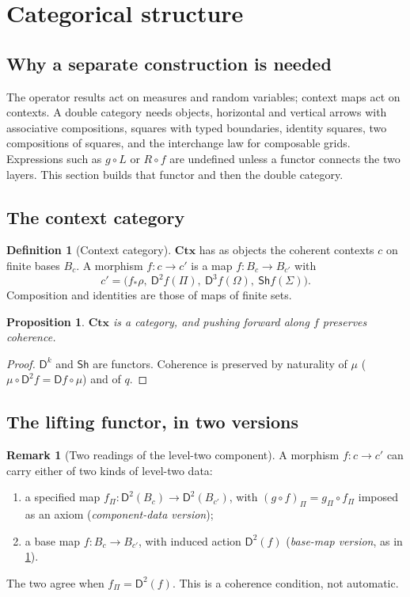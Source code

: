 \documentclass[11pt]{article}
\newtheorem{proposition}[theorem]{Proposition}
\theoremstyle{definition}
\newtheorem{definition}[theorem]{Definition}
\newtheorem{remark}[theorem]{Remark}
\newcommand{\D}{\mathsf D}
\newcommand{\Sh}{\mathsf{Sh}}
\newcommand{\Ctx}{\mathbf{Ctx}}
\begin{document}
\section{Categorical structure}\label{sec:category}

\subsection{Why a separate construction is needed}
The operator results act on measures and random variables; context maps act on contexts. A double category needs objects, horizontal
and vertical arrows with associative compositions, squares with typed boundaries, identity squares, two compositions of squares,
and the interchange law for composable grids. Expressions such as $g\circ L$ or $R\circ f$ are undefined unless a functor connects the
two layers. This section builds that functor and then the double category.

\subsection{The context category}
\begin{definition}[Context category]\label{def:ctx}
$\Ctx$ has as objects the coherent contexts $c$ on finite bases $B_c$. A morphism $f\colon c\to c'$ is a map $f\colon B_c\to B_{c'}$
with
\[
c'=\big(f_*\rho,\ \D^2f(\Pi),\ \D^3f(\Omega),\ \Sh f(\Sigma)\big).
\]
Composition and identities are those of maps of finite sets.
\end{definition}

\begin{proposition}
$\Ctx$ is a category, and pushing forward along $f$ preserves coherence.
\end{proposition}
\begin{proof}
$\D^k$ and $\Sh$ are functors. Coherence is preserved by naturality of $\mu$ ($\mu\circ\D^2f=\D f\circ\mu$) and of $q$.
\end{proof}

\subsection{The lifting functor, in two versions}
\begin{remark}[Two readings of the level-two component]\label{rem:two-versions}
A morphism $f\colon c\to c'$ can carry either of two kinds of level-two data:
\begin{enumerate}[label=(\roman*)]
\item a specified map $f_\Pi\colon\D^2(B_c)\to\D^2(B_{c'})$, with $(g\circ f)_\Pi=g_\Pi\circ f_\Pi$ imposed as an axiom
  (\emph{component-data version});
\item a base map $f\colon B_c\to B_{c'}$, with induced action $\D^2(f)$ (\emph{base-map version}, as in \cref{def:ctx}).
\end{enumerate}
The two agree when $f_\Pi=\D^2(f)$. This is a coherence condition, not automatic.
\end{remark}
\end{document}
